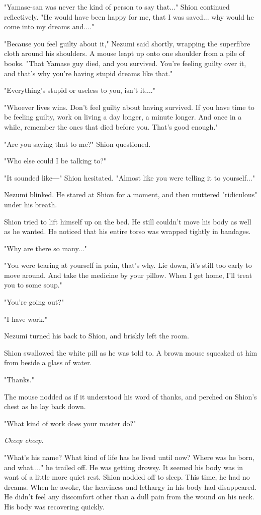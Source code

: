 "Yamase-san was never the kind of person to say that..." Shion continued
reflectively. "He would have been happy for me, that I was saved... why
would he come into my dreams and...."

"Because you feel guilty about it," Nezumi said shortly, wrapping the
superfibre cloth around his shoulders. A mouse leapt up onto one
shoulder from a pile of books. "That Yamase guy died, and you survived.
You're feeling guilty over it, and that's why you're having stupid
dreams like that."

"Everything's stupid or useless to you, isn't it...."~

"Whoever lives wins. Don't feel guilty about having survived. If you
have time to be feeling guilty, work on living a day longer, a minute
longer. And once in a while, remember the ones that died before you.
That's good enough."

"Are you saying that to me?" Shion questioned.

"Who else could I be talking to?"

"It sounded like―" Shion hesitated. "Almost like you were telling it to
yourself..."

Nezumi blinked. He stared at Shion for a moment, and then muttered
"ridiculous" under his breath.~

Shion tried to lift himself up on the bed. He still couldn't move his
body as well as he wanted. He noticed that his entire torso was wrapped
tightly in bandages.

"Why are there so many..."

"You were tearing at yourself in pain, that's why. Lie down, it's still
too early to move around. And take the medicine by your pillow. When I
get home, I'll treat you to some soup."

"You're going out?"

"I have work."

Nezumi turned his back to Shion, and briskly left the room.

Shion swallowed the white pill as he was told to. A brown mouse squeaked
at him from beside a glass of water.

"Thanks."

The mouse nodded as if it understood his word of thanks, and perched on
Shion's chest as he lay back down.

"What kind of work does your master do?"

\emph{Cheep cheep.}

"What's his name? What kind of life has he lived until now? Where was he
born, and what...." he trailed off. He was getting drowsy. It seemed his
body was in want of a little more quiet rest. Shion nodded off to sleep.
This time, he had no dreams. When he awoke, the heaviness and lethargy
in his body had disappeared. He didn't feel any discomfort other than a
dull pain from the wound on his neck. His body was recovering quickly.

